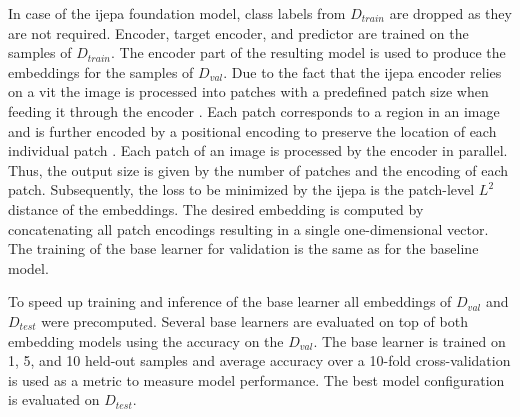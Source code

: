 In case of the \gls{ijepa} foundation model, class labels from $D_{train}$ are dropped as they are not required. 
Encoder, target encoder, and predictor are trained on the samples of $D_{train}$. The encoder part of the resulting 
model is used to produce the embeddings for the samples of $D_{val}$. Due to the fact that the \gls{ijepa} encoder relies 
on a \gls{vit} the image is processed into patches with a predefined patch size when feeding it through the encoder 
\cite{dosovitskiy_image_2021}. Each patch corresponds to a region in an image and is further encoded by a positional 
encoding to preserve the location of each individual patch \cite{dosovitskiy_image_2021}. Each patch of an image 
is processed by the encoder in parallel. Thus, the output size is given by the number of patches and the encoding 
of each patch. Subsequently, the loss to be minimized by the \gls{ijepa} is the patch-level $L^2$ distance of the 
embeddings. The desired embedding is computed by concatenating all patch encodings resulting in a single one-dimensional 
vector. The training of the base learner for validation is the same as for the baseline model. 

To speed up training and inference of the base learner all embeddings of $D_{val}$ and $D_{test}$ were precomputed.
Several base learners are evaluated on top of both embedding models using the accuracy on the $D_{val}$. 
The base learner is trained on 1, 5, and 10 held-out samples and average accuracy over a 10-fold cross-validation is 
used as a metric to measure model performance. The best model configuration is evaluated on $D_{test}$.
